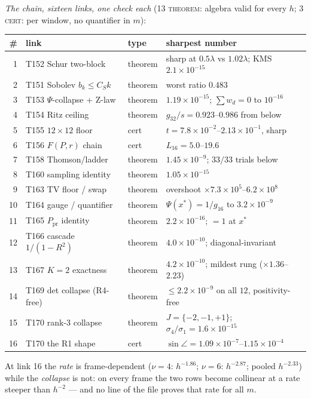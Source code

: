 \documentclass[11pt,a4paper]{article}
\begin{document}
\emph{The chain, sixteen links, one check each} (13 \textsc{theorem}:
algebra valid for every $h$; 3 \textsc{cert}: per window, no quantifier
in $m$):
\begin{center}\small
\begin{tabular}{@{}r l l l@{}}
\toprule
\# & \textbf{link} & \textbf{type} & \textbf{sharpest number}\\
\midrule
1 & T152 Schur two-block & theorem & sharp at $0.5\lambda$ vs $1.02\lambda$; KMS $2.1\times10^{-15}$\\
2 & T151 Sobolev $b_k\le C_Sk$ & theorem & worst ratio $0.483$\\
3 & T153 $\Psi$-collapse + Z-law & theorem & $1.19\times10^{-15}$; $\sum w_d=0$ to $10^{-16}$\\
4 & T154 Ritz ceiling & theorem & $g_{32}/s=0.923$--$0.986$ from below\\
5 & T155 $12\times12$ floor & cert & $t=7.8\times10^{-2}$--$2.13\times10^{-1}$, sharp\\
6 & T156 $F(P,r)$ chain & cert & $L_{16}=5.0$--$19.6$\\
7 & T158 Thomson/ladder & theorem & $1.45\times10^{-9}$; $33/33$ trials below\\
8 & T160 sampling identity & theorem & $1.05\times10^{-15}$\\
9 & T163 TV floor / swap & theorem & overshoot $\times7.3\times10^{5}$--$6.2\times10^{8}$\\
10 & T164 gauge / quantifier & theorem & $\Psi(x^*)=1/g_{16}$ to $3.2\times10^{-9}$\\
11 & T165 $P_{\mathrm{pr}}$ identity & theorem & $2.2\times10^{-16}$; $=1$ at $x^*$\\
12 & T166 cascade $1/(1-R^2)$ & theorem & $4.0\times10^{-10}$; diagonal-invariant\\
13 & T167 $K=2$ exactness & theorem & $4.2\times10^{-10}$; mildest rung ($\times1.36$--$2.23$)\\
14 & T169 det collapse (R4-free) & theorem & $\le2.2\times10^{-9}$ on all $12$, positivity-free\\
15 & T170 rank-3 collapse & theorem & $J=\{-2,-1,+1\}$; $\sigma_4/\sigma_1=1.6\times10^{-15}$\\
16 & T170 the R1 shape & cert & $\sin\angle=1.09\times10^{-7}$--$1.15\times10^{-4}$\\
\bottomrule
\end{tabular}
\end{center}
\noindent At link 16 the \emph{rate} is frame-dependent ($\nu=4$:
$h^{-1.86}$; $\nu=6$: $h^{-2.87}$; pooled $h^{-2.33}$) while the
\emph{collapse} is not: on every frame the two rows become collinear at
a rate steeper than $h^{-2}$ --- and no line of the file proves that
rate for all $m$.
\end{document}
